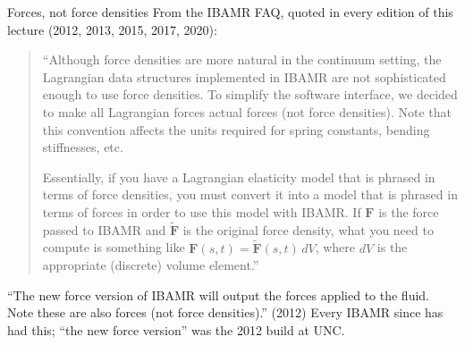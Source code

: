 \documentclass[aspectratio=169,11pt]{beamer}
\begin{document}
\begin{frame}{Forces, not force densities}
\label{fr:faq}
\small From the IBAMR FAQ, quoted in every edition of this lecture (2012, 2013, 2015, 2017, 2020):
\begin{quote}\footnotesize
``Although force densities are more natural in the continuum setting, the Lagrangian data structures implemented in IBAMR are not sophisticated enough to use force densities. To simplify the software interface, we decided to make all Lagrangian forces actual forces (not force densities). Note that this convention affects the units required for spring constants, bending stiffnesses, etc.

Essentially, if you have a Lagrangian elasticity model that is phrased in terms of force densities, you must convert it into a model that is phrased in terms of forces in order to use this model with IBAMR. If $\mathbf{F}$ is the force passed to IBAMR and $\tilde{\mathbf{F}}$ is the original force density, what you need to compute is something like $\mathbf{F}(s,t) = \tilde{\mathbf{F}}(s,t)\,dV$, where $dV$ is the appropriate (discrete) volume element.''
\end{quote}
\vspace{1mm}
\footnotesize ``The new force version of IBAMR will output the forces applied to the fluid. Note these are also forces (not force densities).'' (2012) Every IBAMR since has had this; ``the new force version'' was the 2012 build at UNC.
\end{frame}
\end{document}
